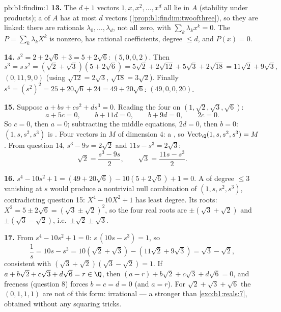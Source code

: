\begin{solution}{pb:b1:findim:1}
\textbf{13.} The $d + 1$ vectors $1, x, x^2, \dots, x^{d}$ all
lie in $A$ (stability under products); a  of $A$ has
at most $d$ vectors (\cref{prop:b1:findim:twoofthree}), so they
are linked: there are rationals $\lambda_0, \dots, \lambda_d$,
not all zero, with $\sum_k \lambda_k x^k = 0$. The  $P
= \sum_k \lambda_k X^k$ is nonzero, has rational coefficients,
degree $\leq d$, and $P(x) = 0$.

\textbf{14.} $s^2 = 2 + 2\sqrt6 + 3 = 5 + 2\sqrt6$: 
$(5, 0, 0, 2)$. Then
\[
s^3 = s\,s^2 = (\sqrt2 + \sqrt3)(5 + 2\sqrt6)
= 5\sqrt2 + 2\sqrt{12} + 5\sqrt3 + 2\sqrt{18}
= 11\sqrt2 + 9\sqrt3 ,
\]
 $(0, 11, 9, 0)$ (using $\sqrt{12} = 2\sqrt3$,
$\sqrt{18} = 3\sqrt2$). Finally $s^4 = (s^2)^2 = 25 + 20\sqrt6 +
24 = 49 + 20\sqrt6$:  $(49, 0, 0, 20)$.

\textbf{15.} Suppose $a + bs + cs^2 + ds^3 = 0$. Reading the four
 on $(1, \sqrt2, \sqrt3, \sqrt6)$:
\[
a + 5c = 0,\qquad b + 11d = 0,\qquad b + 9d = 0,\qquad 2c = 0 .
\]
So $c = 0$, then $a = 0$; subtracting the middle equations, $2d =
0$, then $b = 0$: $(1, s, s^2, s^3)$ is . Four  vectors
in $M$ of dimension $4$: a , so
$\operatorname{Vect}_\Q(1, s, s^2, s^3) = M$. From question 14,
$s^3 - 9s = 2\sqrt2$ and $11s - s^3 = 2\sqrt3$:
\[
\sqrt2 = \frac{s^3 - 9s}{2},
\qquad
\sqrt3 = \frac{11s - s^3}{2} .
\]

\textbf{16.} $s^4 - 10s^2 + 1 = (49 + 20\sqrt6) - 10(5 +
2\sqrt6) + 1 = 0$. A  of degree $\leq 3$
vanishing at $s$ would produce a nontrivial null combination of
$(1, s, s^2, s^3)$, contradicting question 15: $X^4 - 10X^2 + 1$
has least degree. Its roots: $X^2 = 5 \pm 2\sqrt6 = (\sqrt3 \pm
\sqrt2)^2$, so the four real roots are $\pm(\sqrt3 + \sqrt2)$ and
$\pm(\sqrt3 - \sqrt2)$, i.e.\ $\pm\sqrt2 \pm \sqrt3$.

\textbf{17.} From $s^4 - 10s^2 + 1 = 0$: $s\,(10s - s^3) = 1$, so
\[
\frac1s = 10s - s^3 = 10(\sqrt2 + \sqrt3) - (11\sqrt2 + 9\sqrt3)
= \sqrt3 - \sqrt2 ,
\]
consistent with $(\sqrt3 + \sqrt2)(\sqrt3 - \sqrt2) = 1$. If $a +
b\sqrt2 + c\sqrt3 + d\sqrt6 = r \in \Q$, then $(a - r) + b\sqrt2
+ c\sqrt3 + d\sqrt6 = 0$, and freeness (question 8) forces $b = c
= d = 0$ (and $a = r$). For $\sqrt2 + \sqrt3 + \sqrt6$ the
 $(0, 1, 1, 1)$ are not of this form: irrational ---
a  stronger than \cref{exo:b1:reals:7}, obtained without
any squaring tricks.


\end{solution}
